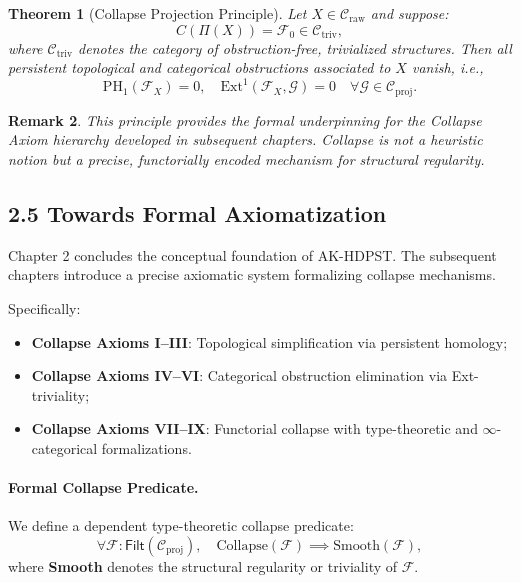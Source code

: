 \documentclass[11pt]{article}
\newtheorem{theorem}{Theorem}[section]
\newtheorem{remark}[theorem]{Remark}
\begin{document}
\begin{theorem}[Collapse Projection Principle]
Let \( X \in \mathcal{C}_{\mathrm{raw}} \) and suppose:
\[
C(\Pi(X)) = \mathcal{F}_0 \in \mathcal{C}_{\mathrm{triv}},
\]
where \( \mathcal{C}_{\mathrm{triv}} \) denotes the category of obstruction-free, trivialized structures. Then all persistent topological and categorical obstructions associated to \( X \) vanish, i.e.,
\[
\mathrm{PH}_1(\mathcal{F}_X) = 0, \quad \mathrm{Ext}^1(\mathcal{F}_X, \mathcal{G}) = 0 \quad \forall \mathcal{G} \in \mathcal{C}_{\mathrm{proj}}.
\]
\end{theorem}

\begin{remark}
This principle provides the formal underpinning for the Collapse Axiom hierarchy developed in subsequent chapters.  
Collapse is not a heuristic notion but a precise, functorially encoded mechanism for structural regularity.
\end{remark}

\subsection*{2.5 Towards Formal Axiomatization}

Chapter 2 concludes the conceptual foundation of AK-HDPST. The subsequent chapters introduce a precise axiomatic system formalizing collapse mechanisms.

Specifically:

\begin{itemize}
    \item \textbf{Collapse Axioms I–III}: Topological simplification via persistent homology;
    \item \textbf{Collapse Axioms IV–VI}: Categorical obstruction elimination via Ext-triviality;
    \item \textbf{Collapse Axioms VII–IX}: Functorial collapse with type-theoretic and $\infty$-categorical formalizations.
\end{itemize}

\paragraph{Formal Collapse Predicate.}  
We define a dependent type-theoretic collapse predicate:
\[
\forall \mathcal{F} : \mathsf{Filt}(\mathcal{C}_{\mathrm{proj}}), \quad \mathrm{Collapse}(\mathcal{F}) \implies \mathrm{Smooth}(\mathcal{F}),
\]
where \textbf{Smooth} denotes the structural regularity or triviality of \( \mathcal{F} \).
\end{document}
